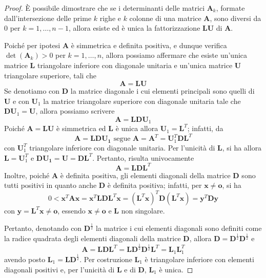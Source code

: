 \begin{proof}
    È possibile dimostrare che se i determinanti delle matrici $\mathbf{A}_k$, formate
    dall'intersezione delle prime $k$ righe e $k$ colonne di una matrice $\mathbf{A}$,
    sono diversi da $0$ per $k=1,\dots,n-1$, allora esiste ed è unica la fattorizzazione
    $\mathbf{LU}$ di $\mathbf{A}$.

    Poiché per ipotesi $\mathbf{A}$ è simmetrica e definita positiva, e dunque verifica
    $\det(\mathbf{A}_k)>0$ per $k=1,\dots,n$, allora possiamo affermare che
    esiste un'unica matrice $\mathbf{L}$ triangolare inferiore con diagonale unitaria e
    un'unica matrice $\mathbf{U}$ triangolare superiore, tali che
    \[\mathbf{A}=\mathbf{LU}\]
    Se denotiamo con $\mathbf{D}$ la matrice diagonale i cui elementi principali sono
    quelli di $\mathbf{U}$ e con $\mathbf{U}_1$ la matrice triangolare superiore con
    diagonale unitaria tale che $\mathbf{DU}_1=\mathbf{U}$, allora possiamo scrivere
    \[\mathbf{A}=\mathbf{LDU}_1\]
    Poiché $\mathbf{A}=\mathbf{LU}$ è simmetrica ed $\mathbf{L}$ è unica allora
    $\mathbf{U}_1=\mathbf{L}^T$; infatti, da
    \[\mathbf{A}=\mathbf{LDU_1}\text{ segue }\mathbf{A}=\mathbf{A}^T=\mathbf{U}_1^T\mathbf{DL}^T\]
    con $\mathbf{U}_1^T$ triangolare inferiore con diagonale unitaria. Per l'unicità di $\mathbf{L}$,
    si ha allora $\mathbf{L}=\mathbf{U}_1^T$ e $\mathbf{DU_1}=\mathbf{U}=\mathbf{DL}^T$.
    Pertanto, risulta univocamente
    \[\mathbf{A}=\mathbf{LDL}^T\]
    Inoltre, poiché $\mathbf{A}$ è definita positiva, gli elementi diagonali della matrice
    $\mathbf{D}$ sono tutti positivi in quanto anche $\mathbf{D}$ è definita positiva; infatti,
    per $\mathbf{x}\ne\mathbf{o}$, si ha
    \[0<\mathbf{x}^T\mathbf{Ax}=\mathbf{x}^T\mathbf{LDL}^T\mathbf{x}=(\mathbf{L}^T\mathbf{x})^T
    \mathbf{D}(\mathbf{L}^T\mathbf{x})=\mathbf{y}^T\mathbf{Dy}\]
    con $\mathbf{y}=\mathbf{L}^T\mathbf{x}\ne\mathbf{o}$, essendo $\mathbf{x}\ne\mathbf{o}$
    e $\mathbf{L}$ non singolare.

    Pertanto, denotando con $\mathbf{D}^\frac12$ la matrice i cui elementi diagonali sono definiti
    come la radice quadrata degli elementi diagonali della matrice $\mathbf{D}$, allora
    $\mathbf{D}=\mathbf{D}^\frac12\mathbf{D}^\frac12$ e
    \[\mathbf{A}=\mathbf{LDL}^T=\mathbf{LD}^\frac12\mathbf{D}^\frac12\mathbf{L}^T=
    \mathbf{L}_1\mathbf{L}_1^T\]
    avendo posto $\mathbf{L}_1=\mathbf{LD}^\frac12$. Per costruzione $\mathbf{L}_1$ è triangolare
    inferiore con elementi diagonali positivi e, per l'unicità di $\mathbf{L}$ e di $\mathbf{D}$,
    $\mathbf{L}_1$ è unica.
\end{proof}

